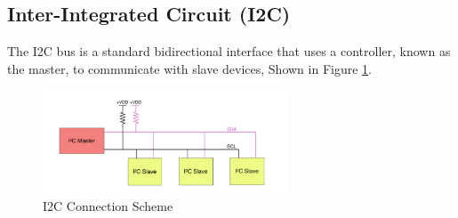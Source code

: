 \documentclass[english]{article}
\begin{document}
\subsection{Inter-Integrated Circuit (I2C)}
The I2C bus is a standard bidirectional interface that uses a controller, known as
the master, to communicate with slave devices, Shown in Figure \ref{fig:I2C}. 
\begin{figure}[!h]
	\centering
	\includegraphics[width=0.65\textwidth,]{figures/I2C_Connection.png}
	\caption{I2C Connection Scheme}
	\label{fig:I2C}
\end{figure}
\end{document}

